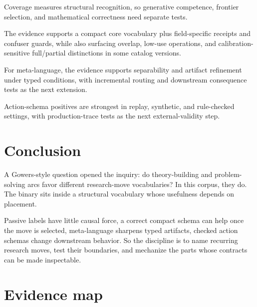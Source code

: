 \documentclass[11pt]{article}
\begin{document}
Coverage measures structural recognition, so generative competence, frontier
selection, and mathematical correctness need separate tests.

The evidence supports a compact core vocabulary plus field-specific receipts and
confuser guards, while also surfacing overlap, low-use operations, and
calibration-sensitive full/partial distinctions in some catalog versions.

For meta-language, the evidence supports separability and artifact refinement
under typed conditions, with incremental routing and downstream consequence
tests as the next extension.

Action-schema positives are strongest in replay, synthetic, and rule-checked
settings, with production-trace tests as the next external-validity step.

\section{Conclusion}

A Gowers-style question opened the inquiry: do theory-building and
problem-solving arcs favor different research-move vocabularies? In this corpus,
they do. The binary sits inside a structural vocabulary whose usefulness depends
on placement.

Passive labels have little causal force, a correct compact schema can help once
the move is selected, meta-language sharpens typed artifacts, checked action
schemas change downstream behavior. So the discipline is to name recurring
research moves, test their boundaries, and mechanize the parts whose contracts can
be made inspectable.

\appendix
\section{Evidence map}
\end{document}
